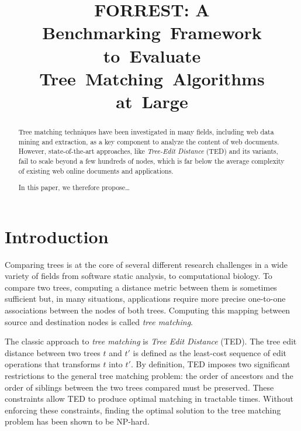 \documentclass{vldb}
\begin{document}
\newtheorem{defn}{Definition}[section]
\newtheorem{prop}{Property}[section]

\newtheorem{assumption}{Assumption}[section]
\newtheorem{theorem}{Theorem}

\newtheorem{rqn}{RQ}[section]

\newtheorem{ex}{Example}[section]

\newtheorem{note}{Note}[section]


\title{FORREST: A Benchmarking~Framework to~Evaluate Tree~Matching~Algorithms at~Large}

\maketitle

\begin{abstract}
Tree matching techniques have been investigated in many fields, including web data mining and extraction, as a key component to analyze the content of web documents.
However, state-of-the-art approaches, like \emph{Tree-Edit Distance} (TED) and its variants, fail to scale beyond a few hundreds of nodes, which is far below the average complexity of existing web online documents and applications.

In this paper, we therefore propose\dots
\end{abstract}

\section{Introduction} 
Comparing trees is at the core of several different research challenges in a wide variety of fields from software static analysis, to computational biology.
To compare two trees, computing a distance metric between them is sometimes sufficient but, in many situations, applications require more precise one-to-one associations between the nodes of both trees.
Computing this mapping between source and destination nodes is called \textit{tree matching}.

The classic approach to \textit{tree matching} is \textit{Tree Edit Distance} (TED).
The tree edit distance between two trees $t$ and $t'$ is defined as the least-cost sequence of edit operations that transforms $t$ into $t'$.
By definition, TED imposes two significant restrictions to the general tree matching problem: the order of ancestors and the order of siblings between the two trees compared must be preserved.
These constraints allow TED to produce optimal matching in tractable times.
Without enforcing these constraints, finding the optimal solution to the tree matching problem has been shown to be NP-hard. 
\end{document}

